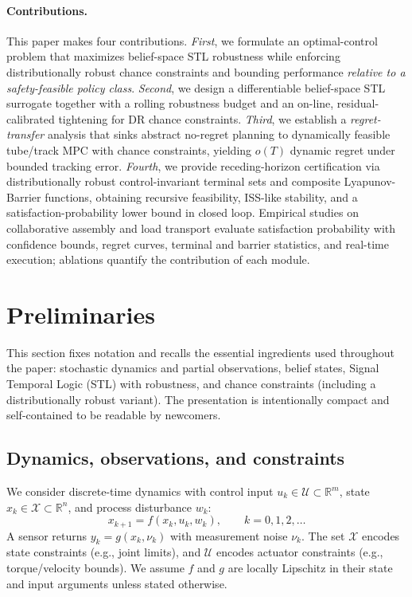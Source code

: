 \documentclass[journal]{IEEEtran}
\theoremstyle{definition}
\begin{document}
\paragraph*{Contributions.}
This paper makes four contributions. \emph{First}, we formulate an optimal-control problem that maximizes belief-space STL robustness while enforcing distributionally robust chance constraints and bounding performance \emph{relative to a safety-feasible policy class}. \emph{Second}, we design a differentiable belief-space STL surrogate together with a rolling robustness budget and an on-line, residual-calibrated tightening for DR chance constraints. \emph{Third}, we establish a \emph{regret-transfer} analysis that sinks abstract no-regret planning to dynamically feasible tube/track MPC with chance constraints, yielding \(o(T)\) dynamic regret under bounded tracking error. \emph{Fourth}, we provide receding-horizon certification via distributionally robust control-invariant terminal sets and composite Lyapunov-Barrier functions, obtaining recursive feasibility, ISS-like stability, and a satisfaction-probability lower bound in closed loop. Empirical studies on collaborative assembly and load transport evaluate satisfaction probability with confidence bounds, regret curves, terminal and barrier statistics, and real-time execution; ablations quantify the contribution of each module.

\section{Preliminaries}

This section fixes notation and recalls the essential ingredients used throughout the paper:
stochastic dynamics and partial observations, belief states, Signal Temporal Logic (STL) with
robustness, and chance constraints (including a distributionally robust variant). The presentation
is intentionally compact and self-contained to be readable by newcomers.

\subsection{Dynamics, observations, and constraints}
We consider discrete-time dynamics with control input $u_k\in\mathcal{U}\subset\mathbb{R}^{m}$,
state $x_k\in\mathcal{X}\subset\mathbb{R}^{n}$, and process disturbance $w_k$:
\begin{equation}
  x_{k+1} = f(x_k,u_k,w_k), \qquad k=0,1,2,\dots
  \label{eq:dynamics}
\end{equation}
A sensor returns $y_k=g(x_k,\nu_k)$ with measurement noise $\nu_k$.
The set $\mathcal{X}$ encodes state constraints (e.g., joint limits), and $\mathcal{U}$ encodes actuator
constraints (e.g., torque/velocity bounds). We assume $f$ and $g$ are locally Lipschitz in their
state and input arguments unless stated otherwise.
\end{document}

